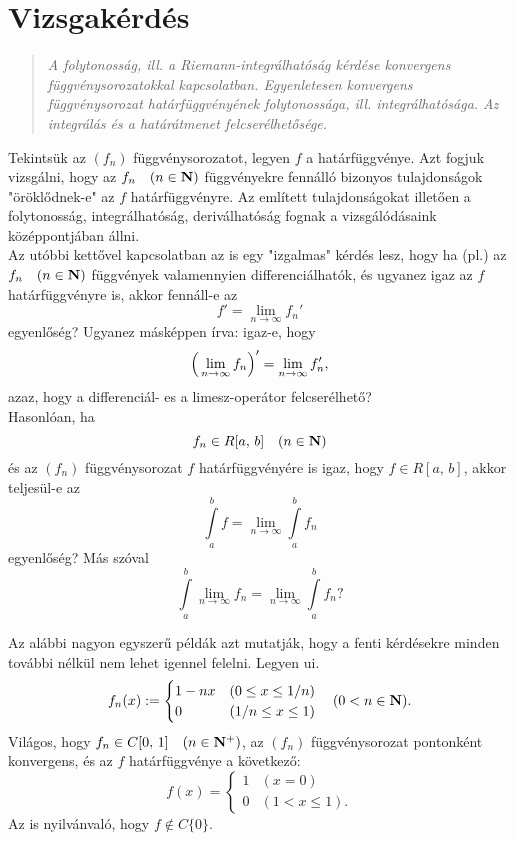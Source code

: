 \newpage
\section{Vizsgakérdés}
\begin{quote}
	\textit{A folytonosság, ill. a Riemann-integrálhatóság kérdése konvergens függvénysorozatokkal kapcsolatban. Egyenletesen konvergens függvénysorozat határfüggvényének folytonossága, ill. integrálhatósága. Az integrálás és a határátmenet felcserélhetősége.}
\end{quote}

Tekintsük az $(f_n)$ függvénysorozatot, legyen $f$ a határfüggvénye. Azt fogjuk vizsgálni, hogy az $f_n \quad (n \in \mathbf{N})$ függvényekre fennálló bizonyos tulajdonságok "öröklődnek-e" az $f$ határfüggvényre. Az említett tulajdonságokat illetően a folytonosság, integrálhatóság, deriválhatóság fognak a vizsgálódásaink középpontjában állni.\\

Az utóbbi kettővel kapcsolatban az is egy "izgalmas" kérdés lesz, hogy ha (pl.) az $f_n \quad (n \in \mathbf{N})$ függvények valamennyien differenciálhatók, és ugyanez igaz az $f$ határfüggvényre is, akkor fennáll-e az
\[
	f' = \lim_{n \to \infty} f_n'
\]
egyenlőség? Ugyanez másképpen írva: igaz-e, hogy
\[
	\Big(  \lim_{n \to \infty} f_n  \Big)' = \lim_{n \to \infty} f'_n,
\]
azaz, hogy a differenciál- es a limesz-operátor felcserélhető?\\

Hasonlóan, ha
\[
	f_n \in R[a, \, b] \quad (n \in \mathbf{N})
\]
és az $(f_n)$ függvénysorozat $f$ határfüggvényére is igaz, hogy $f \in R[a, \, b]$, akkor teljesül-e az
\[
	\int\limits_a^b f = \lim_{n \to \infty} \int\limits_a^b f_n
\]
egyenlőség? Más szóval
\[
	\int\limits_a^b \lim_{n \to \infty} f_n = \lim_{n \to \infty} \int\limits_a^b f_n?
\]

Az alábbi nagyon egyszerű példák azt mutatják, hogy a fenti kérdésekre minden további nélkül nem lehet igennel felelni. Legyen ui.
\[
	f_n(x) := \begin{cases}
		1 - nx & (0 \leq x \leq 1/n)\\
		0 & (1/n \leq x \leq 1) 
	\end{cases} \quad (0 < n \in \mathbf{N}).
\]
Világos, hogy $f_n \in C[0, \, 1] \quad (n \in \mathbf{N}^+)$, az $(f_n)$ függvénysorozat pontonként konvergens, és az $f$ határfüggvénye a következő:
\[
	f(x) = \begin{cases}
		1 & (x = 0) \\
		0 & (1 < x \leq 1).
	\end{cases}
\]
Az is nyilvánvaló, hogy $f \not \in C\{0\}$.\\


